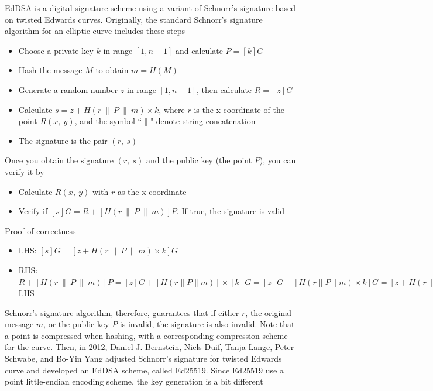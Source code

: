 EdDSA is a digital signature scheme using a variant of Schnorr’s signature based on twisted Edwards curves. Originally, the standard Schnorr’s signature algorithm for an elliptic curve includes these steps

\begin{itemize}
  \item Choose a private key $k$ in range $[1, n -1]$ and calculate $P = [k]G$
  \item Hash the message $M$ to obtain $m = H(M)$
  \item Generate a random number $z$ in range $[1, n -1]$, then calculate $R = [z]G$
  \item Calculate $s = z + H(r \ \| \ P \ \| \ m) \times k$, where $r$ is the x-coordinate of the point $R(x, \ y)$, and the symbol ``$\|$" denote string concatenation
  \item The signature is the pair $(r, \ s)$
\end{itemize}

Once you obtain the signature $(r, \ s)$ and the public key (the point $P$), you can verify it by

\begin{itemize}
  \item Calculate $R(x, \ y)$ with $r$ as the x-coordinate
  \item Verify if $[s]G = R + [H(r \ \| \ P \ \| \ m)]P$. If true, the signature is valid
\end{itemize}

Proof of correctness

\begin{itemize}
  \item LHS: $[s]G = [z + H(r \ \| \ P \ \| \ m) \times k]G$
  \item RHS: $R + [H(r \ \| \ P \ \| \ m)] P = [z]G + [H(r \| P \| m)] \times [k]G = [z]G + [H(r \| P \| m) \times k]G = [z + H(r \ \| \ P \ \| \ m) \times k]G =$ LHS
\end{itemize}

Schnorr’s signature algorithm, therefore, guarantees that if either $r$, the original message $m$, or the public key $P$ is invalid, the signature is also invalid. Note that a point is compressed when hashing, with a corresponding compression scheme for the curve. Then, in 2012, Daniel J. Bernstein, Niels Duif, Tanja Lange, Peter Schwabe, and Bo-Yin Yang adjusted Schnorr’s signature for twisted Edwards curve and developed an EdDSA scheme, called Ed25519. Since Ed25519 use a point little-endian encoding scheme, the key generation is a bit different

